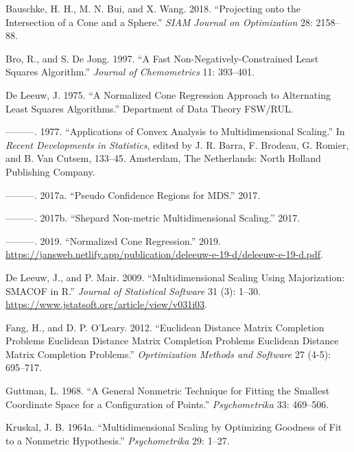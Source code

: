 \documentclass[
  12pt,
]{article}
\newlength{\cslhangindent}
\newenvironment{CSLReferences}[2] %
 {\begin{list}{}{%
  \setlength{\itemindent}{0pt}
  \setlength{\leftmargin}{0pt}
  \setlength{\parsep}{0pt}
  \ifodd #1
   \setlength{\leftmargin}{\cslhangindent}
   \setlength{\itemindent}{-1\cslhangindent}
  \fi
  \setlength{\itemsep}{#2\baselineskip}}}
 {\end{list}}
\begin{document}
\label{refs}
\begin{CSLReferences}{1}{0}
Bauschke, H. H., M. N. Bui, and X. Wang. 2018. {``{Projecting onto the Intersection of a Cone and a Sphere}.''} \emph{SIAM Journal on Optimization} 28: 2158--88.

Bro, R., and S. De Jong. 1997. {``A Fast Non-Negatively-Constrained Least Squares Algorithm.''} \emph{Journal of Chemometrics} 11: 393--401.

De Leeuw, J. 1975. {``{A Normalized Cone Regression Approach to Alternating Least Squares Algorithms}.''} Department of Data Theory FSW/RUL.

---------. 1977. {``Applications of Convex Analysis to Multidimensional Scaling.''} In \emph{Recent Developments in Statistics}, edited by J. R. Barra, F. Brodeau, G. Romier, and B. Van Cutsem, 133--45. Amsterdam, The Netherlands: North Holland Publishing Company.

---------. 2017a. {``{Pseudo Confidence Regions for MDS}.''} 2017.

---------. 2017b. {``{Shepard Non-metric Multidimensional Scaling}.''} 2017.

---------. 2019. {``Normalized Cone Regression.''} 2019. \url{https://jansweb.netlify.app/publication/deleeuw-e-19-d/deleeuw-e-19-d.pdf}.

De Leeuw, J., and P. Mair. 2009. {``{Multidimensional Scaling Using Majorization: SMACOF in R}.''} \emph{Journal of Statistical Software} 31 (3): 1--30. \url{https://www.jstatsoft.org/article/view/v031i03}.

Fang, H., and D. P. O'Leary. 2012. {``Euclidean Distance Matrix Completion Problems Euclidean Distance Matrix Completion Problems Euclidean Distance Matrix Completion Problems.''} \emph{Oprtimization Methods and Software} 27 (4-5): 695--717.

Guttman, L. 1968. {``{A General Nonmetric Technique for Fitting the Smallest Coordinate Space for a Configuration of Points}.''} \emph{Psychometrika} 33: 469--506.

Kruskal, J. B. 1964a. {``{Multidimensional Scaling by Optimizing Goodness of Fit to a Nonmetric Hypothesis}.''} \emph{Psychometrika} 29: 1--27.


\end{CSLReferences}
\end{document}
